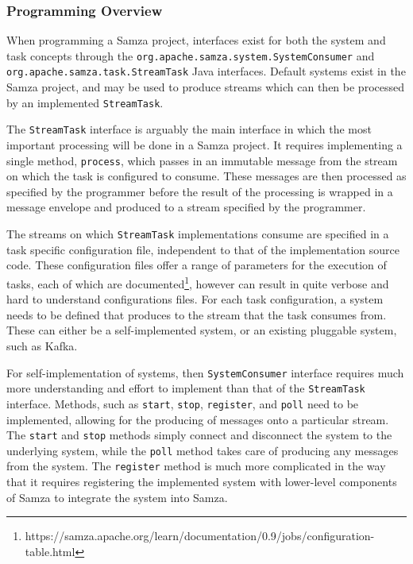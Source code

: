 \subsubsection{Programming Overview}

When programming a Samza project, interfaces exist for both the system and task concepts through the \texttt{org.apache.samza.system.SystemConsumer}
and \texttt{org.apache.samza.task.StreamTask} Java interfaces. Default systems exist in the Samza project, and may be
used to produce streams which can then be processed by an implemented \texttt{StreamTask}.

The \texttt{StreamTask} interface is arguably the main interface in which the most important processing will be done in
a Samza project. It requires implementing a single method, \texttt{process}, which passes in an immutable message from the stream
on which the task is configured to consume. These messages are then processed as specified by the programmer before the
result of the processing is wrapped in a message envelope and produced to a stream specified by the programmer.

The streams on which \texttt{StreamTask} implementations consume are specified in a task specific configuration file,
independent to that of the implementation source code. These configuration files offer a range of parameters for the
execution of tasks, each of which are documented\footnote{https://samza.apache.org/learn/documentation/0.9/jobs/configuration-table.html},
however can result in quite verbose and hard to understand configurations files. For each task configuration, a system
needs to be defined that produces to the stream that the task consumes from. These can either be a self-implemented
system, or an existing pluggable system, such as Kafka.

For self-implementation of systems, then \texttt{SystemConsumer} interface requires much more understanding and effort to
implement than that of the \texttt{StreamTask} interface. Methods, such as \texttt{start}, \texttt{stop}, \texttt{register},
and \texttt{poll} need to be implemented, allowing for the producing of messages onto a particular stream. The \texttt{start}
and \texttt{stop} methods simply connect and disconnect the system to the underlying system, while the \texttt{poll}
method takes care of producing any messages from the system. The \texttt{register} method is much more complicated in the
way that it requires registering the implemented system with lower-level components of Samza to integrate the system into
Samza.

